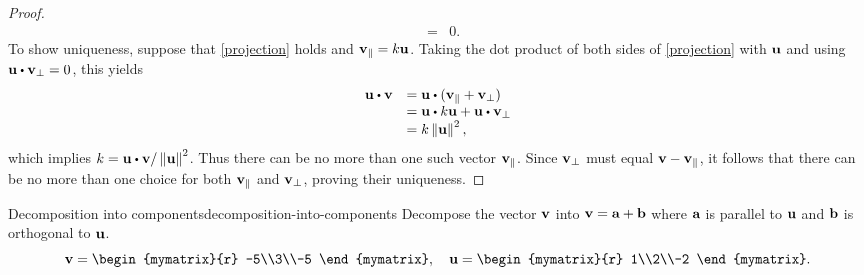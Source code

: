 \begin{proof}
\begin{eqnarray*}
    &=& 0.
  \end{eqnarray*}
  To show uniqueness, suppose that {\eqref{projection}} holds and
  $\vect{v}_{\coll}= k \vect{u}$.  Taking the dot product of both
  sides of {\eqref{projection}} with $\vect{u}$ and using
  $\vect{u}\dotprod\vect{v}_{\bot}=0$, this yields
  \begin{equation*}
    \begin{array}{ll}
      \vect{u}\dotprod \vect{v} & = \vect{u}\dotprod( \vect{v}_{\coll}+\vect{v}_{\bot}) \\
                                & =  \vect{u} \dotprod k\vect{u} + \vect{u}\dotprod\vect{v}_{\bot} \\
                                & = k \norm{\vect{u}}^2,
    \end{array}
  \end{equation*}
  which implies
  $k =\vect{u}\dotprod \vect{v} / \norm{\vect{u}}^2$.  Thus there
  can be no more than one such vector $\vect{v}_{\coll}$. Since
  $\vect{v}_{\bot}$ must equal $\vect{v}-\vect{v}_{\coll}$, it follows
  that there can be no more than one choice for both
  $\vect{v}_{\coll}$ and $\vect{v}_{\bot}$, proving their uniqueness.
\end{proof}

\begin{example}{Decomposition into components}{decomposition-into-components}
  Decompose the vector $\vect{v}$ into $\vect{v}=\vect{a}+\vect{b}$
  where $\vect{a}$ is parallel to $\vect{u}$ and $\vect{b}$ is
  orthogonal to $\vect{u}$.
  \begin{equation*}
    \vect{v} = \begin{mymatrix}{r} -5\\3\\-5 \end{mymatrix},\quad
    \vect{u} = \begin{mymatrix}{r} 1\\2\\-2 \end{mymatrix}.
  \end{equation*}
\end{example}

